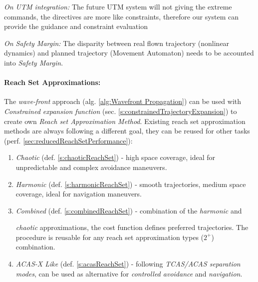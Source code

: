 \begin{note}
    \emph{On UTM integration:} The future UTM system will not giving the extreme commands, the directives are more like constraints, therefore our system can provide the guidance and constraint evaluation
\end{note}

\begin{note}
    \emph{On Safety Margin:} The disparity between real flown trajectory (nonlinear dynamics) and planned trajectory (Movement Automaton) needs to be accounted into \emph{Safety Margin}.
\end{note}

\paragraph{Reach Set Approximations:} The \emph{wave-front} approach (alg. \ref{alg:Wavefront Propagation}) can be used with \emph{Constrained expansion function} (sec. \ref{s:constrainedTrajectoryExpansion}) to create own \emph{Reach set Approximation Method}. Existing  reach set approximation methods are always following a different goal, they can be reused for other tasks (perf. \ref{sec:reducedReachSetPerformance}):

\begin{enumerate}
    \item \emph{Chaotic} (def. \ref{s:chaoticReachSet}) - high space coverage, ideal for unpredictable and complex avoidance maneuvers.
    
    \item \emph{Harmonic} (def. \ref{s:harmonicReachSet}) - smooth trajectories, medium space coverage, ideal for navigation maneuvers.
    \item \emph{Combined} (def. \ref{s:combinedReachSet}) - combination of the \emph{harmonic} and 
    
    \emph{chaotic} approximations, the cost function defines preferred trajectories. The procedure is reusable for any reach set approximation types ($2^+$) combination.
    
    \item \emph{ACAS-X Like} (def. \ref{s:acasReachSet}) - following \emph{TCAS/ACAS separation modes}, can be used as alternative for \emph{controlled avoidance} and \emph{navigation}.
\end{enumerate}


